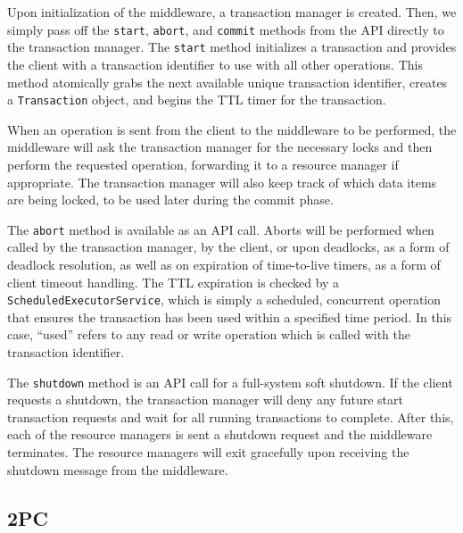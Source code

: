 \documentclass[11pt]{article}
\begin{document}
Upon initialization of the middleware, a transaction manager is created. Then, we simply pass off the \texttt{start}, \texttt{abort}, and \texttt{commit} methods from the API directly to the transaction manager. The \texttt{start} method initializes a transaction and provides the client with a transaction identifier to use with all other operations. This method atomically grabs the next available unique transaction identifier, creates a \texttt{Transaction} object, and begins the TTL timer for the transaction. \par

When an operation is sent from the client to the middleware to be performed, the middleware will ask the transaction manager for the necessary locks and then perform the requested operation, forwarding it to a resource manager if appropriate. The transaction manager will also keep track of which data items are being locked, to be used later during the commit phase.

The \texttt{abort} method is available as an API call. Aborts will be performed when called by the transaction manager, by the client, or upon deadlocks, as a form of deadlock resolution, as well as on expiration of time-to-live timers, as a form of client timeout handling. The TTL expiration is checked by a \texttt{ScheduledExecutorService}, which is simply a scheduled, concurrent operation that ensures the transaction has been used within a specified time period. In this case, ``used'' refers to any read or write operation which is called with the transaction identifier.  \par

The \texttt{shutdown} method is an API call for a full-system soft shutdown. If the client requests a shutdown, the transaction manager will deny any future start transaction requests and wait for all running transactions to complete. After this, each of the resource managers is sent a shutdown request and the middleware terminates. The resource managers will exit gracefully upon receiving the shutdown message from the middleware. \par

\subsection*{2PC}
\end{document}
